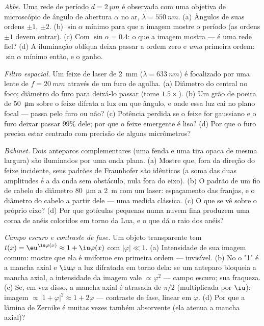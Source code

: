 \begin{exercise}[$\star\star$]\label{exo:b2:diffraction:8}
\emph{Abbe.} Uma rede de período $d = \qty{2}{\micro m}$ é observada com uma
objetiva de microscópio de ângulo de abertura $\alpha$ no ar, $\lambda = \qty{550}{nm}$.
(a) Ângulos de suas ordens $\pm1$, $\pm2$. (b) $\sin\alpha$ mínimo para que a imagem
mostre o período (as ordens $\pm1$ devem entrar). (c) Com $\sin\alpha = 0.4$: o que
a imagem mostra --- é uma rede fiel? (d) A iluminação
oblíqua deixa passar a ordem zero e \emph{uma} primeira ordem:
$\sin\alpha$ mínimo então, e o ganho.
\end{exercise}

\begin{exercise}[$\star\star$]\label{exo:b2:diffraction:9}
\emph{Filtro espacial.} Um feixe de laser de \qty{2}{mm} ($\lambda = \qty{633}{nm}$) é
focalizado por uma lente de $f = \qty{20}{mm}$ através de um furo de agulha. (a) Diâmetro do
 central no foco; diâmetro do furo para deixá-lo passar
(tome $1.5\times$). (b) Um grão de poeira de \qty{50}{\micro m} sobre o feixe
difrata a luz em que ângulo, e onde essa luz cai no
plano focal --- passa pelo furo ou não? (c) Potência perdida se o feixe
for gaussiano e o furo deixar passar $99\%$ dele; por que o feixe emergente
é liso? (d) Por que o furo precisa estar centrado com precisão de alguns
micrômetros?
\end{exercise}

\begin{exercise}[$\star\star\star$]\label{exo:b2:diffraction:10}
\emph{Babinet.} Dois anteparos complementares (uma fenda e uma tira
opaca de mesma largura) são iluminados por uma onda plana. (a) Mostre que, fora
da direção do feixe incidente, seus padrões de Fraunhofer
são idênticos (a soma das duas amplitudes é a da
onda sem obstáculo, nula fora do eixo). (b) O padrão de um fio de cabelo de
diâmetro \qty{80}{\micro m} a \qty{2}{m} com um laser: espaçamento das franjas, e o
diâmetro do cabelo a partir dele --- uma medida clássica. (c) O que se vê
sobre o próprio eixo? (d) Por que gotículas pequenas numa nuvem fina produzem uma
coroa de anéis coloridos em torno da Lua, e o que dá o raio
dos anéis?
\end{exercise}

\begin{exercise}[$\star\star\star$]\label{exo:b2:diffraction:11}
\emph{Campo escuro e contraste de fase.} Um objeto transparente tem
$t(x) = \eu^{\iu\varphi(x)} \approx 1 + \iu\varphi(x)$ com $|\varphi| \ll 1$. (a) Intensidade de
sua imagem comum: mostre que ela é uniforme em primeira ordem --- invisível. (b)
No  o "1" é a mancha axial e $\iu\varphi$ a
luz difratada em torno dela: se um anteparo bloqueia a mancha axial, a intensidade
da imagem vale $\propto\varphi^2$ --- campo escuro; sua fraqueza. (c) Se, em vez disso, a
mancha axial é atrasada de $\pi/2$ (multiplicada por $\iu$): imagem $\propto|1 +
\varphi|^2 \approx 1 + 2\varphi$ --- contraste de fase, linear em $\varphi$. (d) Por que a
lâmina de Zernike é muitas vezes também absorvente (ela atenua a mancha axial)?
\end{exercise}

